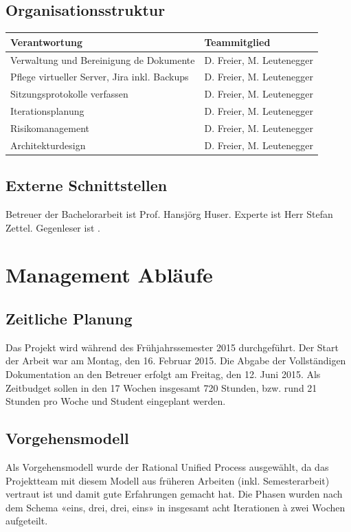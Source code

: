 	\subsection*{Organisationsstruktur}
		\begin{tabularx}{\textwidth}{Xl}
			\textbf{Verantwortung}	& \textbf{Teammitglied} \\
			\hline
			Verwaltung und Bereinigung de Dokumente		& D. Freier, M. Leutenegger \\ \hline
			Pflege virtueller Server, Jira inkl. Backups	& D. Freier, M. Leutenegger \\ \hline
			Sitzungsprotokolle verfassen					& D. Freier, M. Leutenegger \\ \hline
			Iterationsplanung							& D. Freier, M. Leutenegger \\ \hline
			Risikomanagement								& D. Freier, M. Leutenegger \\ \hline
			Architekturdesign							& D. Freier, M. Leutenegger \\ \hline
		\end{tabularx}

	\subsection*{Externe Schnittstellen}
		Betreuer der Bachelorarbeit ist Prof. Hansjörg Huser. Experte ist Herr Stefan Zettel. Gegenleser ist \tbd .
\pagebreak

\section*{Management Abläufe}
	\subsection*{Zeitliche Planung}
		Das Projekt wird während des Frühjahrssemester 2015 durchgeführt. Der Start der Arbeit war am Montag, 
		den 16. Februar 2015. Die Abgabe der Vollständigen Dokumentation an den Betreuer erfolgt am Freitag, 
		den 12. Juni 2015. Als Zeitbudget sollen in den 17 Wochen insgesamt 720 Stunden, bzw. rund 21 Stunden 
		pro Woche und Student eingeplant werden.

	\subsection*{Vorgehensmodell}
		Als Vorgehensmodell wurde der Rational Unified Process ausgewählt, da das Projektteam mit diesem Modell 
		aus früheren Arbeiten (inkl. Semesterarbeit) vertraut ist und damit gute Erfahrungen gemacht hat. Die 
		Phasen wurden nach dem Schema «eins, drei, drei, eins» in insgesamt acht Iterationen à zwei Wochen aufgeteilt.

